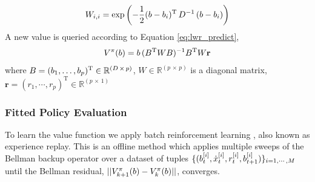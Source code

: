 \begin{equation}\label{eq:W}
 W_{i,i}  = \exp\left(-\frac{1}{2}(b - b_i)^{\mathrm{T}}\, D^{-1} \, (b - b_i) \right)
\end{equation}
A new value is queried according to Equation \ref{eq:lwr_predict},
\begin{equation}\label{eq:lwr_predict}
  V^{\pi}(b) = b \,(B^{\mathrm{T}} W B)^{-1} B^{\mathrm{T}} W \mathbf{r}
\end{equation}
where $B = (b_1,\dots,b_p)^{\mathrm{T}} \in \mathbb{R}^{(D\, \times\, p)}$, $W \in \mathbb{R}^{(p\, \times\, p)}$ is
a diagonal matrix, $\mathbf{r} = (r_1,\cdots,r_p)^{\mathrm{T}} \in \mathbb{R}^{(p\, \times\, 1)}$


\subsubsection{Fitted Policy Evaluation}

To learn the value function we apply batch reinforcement learning \cite{EGW05}, also known as experience replay.
This is an offline method which applies multiple sweeps of the Bellman backup operator 
over a dataset of tuples $\{(b^{[i]}_t,\dot{x}^{[i]}_t,r^{[i]}_{t},b^{[i]}_{t+1})\}_{i=1,\cdots,M}$ until the Bellman residual,
$||V^{\pi}_{k+1}(b) - V^{\pi}_{k}(b)||$, converges. 


